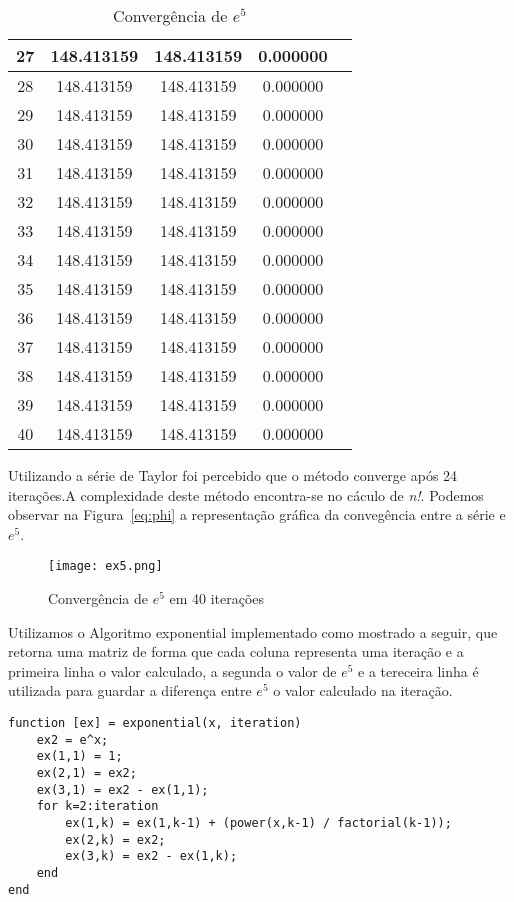\begin{table}[H]
\begin{tabular}{|c|c|c|c|c|}
		\hline
		27 & 148.413159 & 148.413159 & 0.000000\\
		\hline
		28 & 148.413159 & 148.413159 & 0.000000\\
		\hline
		29 & 148.413159 & 148.413159 & 0.000000\\
		\hline
		30 & 148.413159 & 148.413159 & 0.000000\\
		\hline
		31 & 148.413159 & 148.413159 & 0.000000\\
		\hline
		32 & 148.413159 & 148.413159 & 0.000000\\
		\hline
		33 & 148.413159 & 148.413159 & 0.000000\\
		\hline
		34 & 148.413159 & 148.413159 & 0.000000\\
		\hline
		35 & 148.413159 & 148.413159 & 0.000000\\
		\hline
		36 & 148.413159 & 148.413159 & 0.000000\\
		\hline
		37 & 148.413159 & 148.413159 & 0.000000\\
		\hline
		38 & 148.413159 & 148.413159 & 0.000000\\
		\hline
		39 & 148.413159 & 148.413159 & 0.000000\\
		\hline
		40 & 148.413159 & 148.413159 & 0.000000\\
		\hline
	\end{tabular}
	\label{ex_table}
	\caption{Convergência de $e^5$}
\end{table}

Utilizando a série de Taylor foi percebido que o método converge após 24
iterações.A complexidade deste método encontra-se no cáculo de \emph{n!}.
Podemos observar na Figura~\ref{eq:phi} a representação gráfica da convegência
entre a série e $e^5$. 

\begin{figure}[H] \centering
	\texttt{[image: ex5.png]} 
\caption{Convergência de $e^5$ em 40 iterações}
\label{ex5} 
\end{figure}

Utilizamos o Algoritmo exponential implementado como mostrado a seguir,
que retorna uma matriz de forma que cada coluna representa uma iteração e
a primeira linha o valor calculado, a segunda o valor de $e^5$ e a
tereceira linha é utilizada para guardar a diferença entre $e^5$ o valor
calculado na iteração.

\begin{lstlisting}
function [ex] = exponential(x, iteration)
	ex2 = e^x;
	ex(1,1) = 1;
	ex(2,1) = ex2;
	ex(3,1) = ex2 - ex(1,1);
	for k=2:iteration
		ex(1,k) = ex(1,k-1) + (power(x,k-1) / factorial(k-1));
		ex(2,k) = ex2;
		ex(3,k) = ex2 - ex(1,k);
	end
end
\end{lstlisting}

